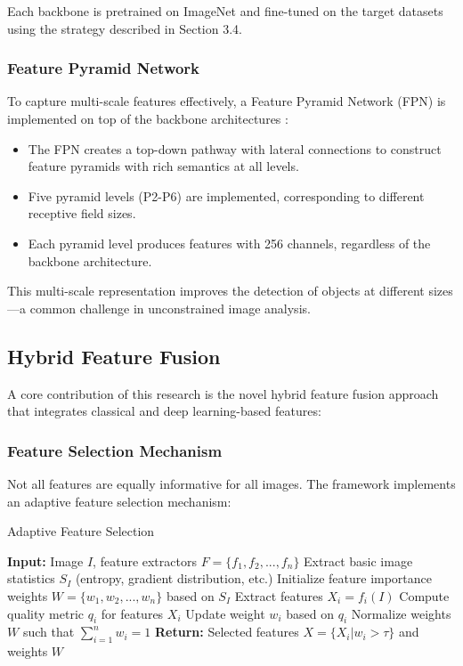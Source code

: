 Each backbone is pretrained on ImageNet and fine-tuned on the target datasets using the strategy described in Section 3.4.

\subsubsection{Feature Pyramid Network}
To capture multi-scale features effectively, a Feature Pyramid Network (FPN) is implemented on top of the backbone architectures \cite{lin2017feature}:

\begin{itemize}
    \item The FPN creates a top-down pathway with lateral connections to construct feature pyramids with rich semantics at all levels.
    
    \item Five pyramid levels (P2-P6) are implemented, corresponding to different receptive field sizes.
    
    \item Each pyramid level produces features with 256 channels, regardless of the backbone architecture.
\end{itemize}

This multi-scale representation improves the detection of objects at different sizes—a common challenge in unconstrained image analysis.

\subsection{Hybrid Feature Fusion}
A core contribution of this research is the novel hybrid feature fusion approach that integrates classical and deep learning-based features:

\subsubsection{Feature Selection Mechanism}
Not all features are equally informative for all images. The framework implements an adaptive feature selection mechanism:

\begin{algorithm}
\caption{Adaptive Feature Selection}
\begin{algorithmic}[1]
\STATE \textbf{Input:} Image $I$, feature extractors $F = \{f_1, f_2, ..., f_n\}$
\STATE Extract basic image statistics $S_I$ (entropy, gradient distribution, etc.)
\STATE Initialize feature importance weights $W = \{w_1, w_2, ..., w_n\}$ based on $S_I$
    \STATE Extract features $X_i = f_i(I)$
    \STATE Compute quality metric $q_i$ for features $X_i$
    \STATE Update weight $w_i$ based on $q_i$
\ENDFOR
\STATE Normalize weights $W$ such that $\sum_{i=1}^{n} w_i = 1$
\STATE \textbf{Return:} Selected features $X = \{X_i | w_i > \tau\}$ and weights $W$
\end{algorithmic}
\end{algorithm}

